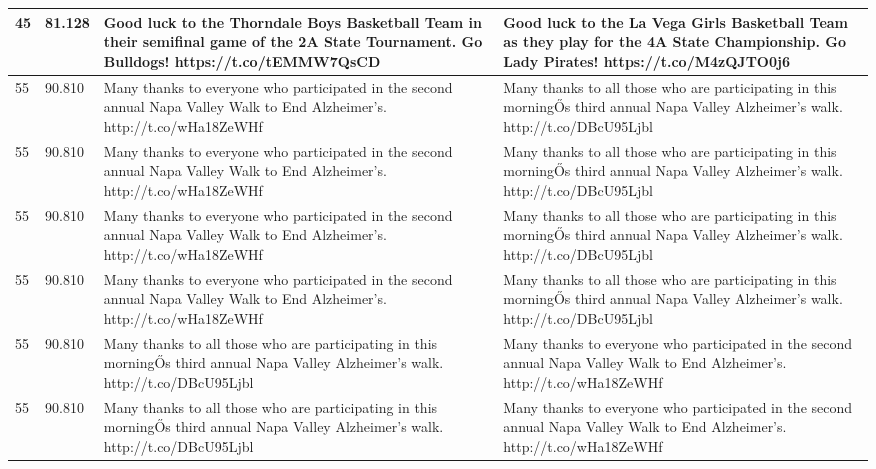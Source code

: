 \begin{table}[]
\begin{tabular}{|p{}|p{}|p{}|p{}|}
45       & 81.128                      & Good luck to the Thorndale Boys Basketball Team in their semifinal game of the 2A State Tournament. Go Bulldogs! https://t.co/tEMMW7QsCD                & Good luck to the La Vega Girls Basketball Team as they play for the 4A State Championship. Go Lady Pirates! https://t.co/M4zQJTO0j6                 \\ \hline
55       & 90.810                      & Many thanks to everyone who participated in the second annual Napa Valley Walk to End Alzheimer's. http://t.co/wHa18ZeWHf                               & Many thanks to all those who are participating in this morningŐs third annual Napa Valley Alzheimer's walk. http://t.co/DBcU95Ljbl                  \\ \hline
55       & 90.810                      & Many thanks to everyone who participated in the second annual Napa Valley Walk to End Alzheimer's. http://t.co/wHa18ZeWHf                               & Many thanks to all those who are participating in this morningŐs third annual Napa Valley Alzheimer's walk. http://t.co/DBcU95Ljbl                  \\ \hline
55       & 90.810                      & Many thanks to everyone who participated in the second annual Napa Valley Walk to End Alzheimer's. http://t.co/wHa18ZeWHf                               & Many thanks to all those who are participating in this morningŐs third annual Napa Valley Alzheimer's walk. http://t.co/DBcU95Ljbl                  \\ \hline
55       & 90.810                      & Many thanks to everyone who participated in the second annual Napa Valley Walk to End Alzheimer's. http://t.co/wHa18ZeWHf                               & Many thanks to all those who are participating in this morningŐs third annual Napa Valley Alzheimer's walk. http://t.co/DBcU95Ljbl                  \\ \hline
55       & 90.810                      & Many thanks to all those who are participating in this morningŐs third annual Napa Valley Alzheimer's walk. http://t.co/DBcU95Ljbl                      & Many thanks to everyone who participated in the second annual Napa Valley Walk to End Alzheimer's. http://t.co/wHa18ZeWHf                           \\ \hline
55       & 90.810                      & Many thanks to all those who are participating in this morningŐs third annual Napa Valley Alzheimer's walk. http://t.co/DBcU95Ljbl                      & Many thanks to everyone who participated in the second annual Napa Valley Walk to End Alzheimer's. http://t.co/wHa18ZeWHf                           \\ \hline

\end{tabular}
\end{table}
